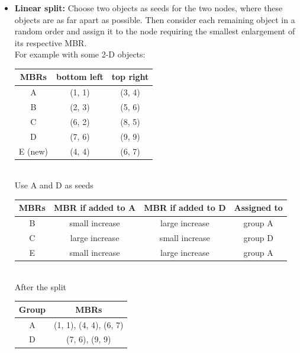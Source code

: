 \documentclass{article}
\begin{document}
\begin{itemize}
    \item \textbf{Linear split:} Choose two objects as seeds for the two nodes, where these objects are as far apart as possible. Then consider each remaining object in a random order and assign it to the node requiring the smallest enlargement of its respective MBR.\\
    For example with some 2-D objects:
    \begin{table}[h]
        \centering
        \begin{tabular}{|c|c|c|}
            \hline
            MBRs & bottom left & top right \\
            \hline
            A & (1, 1) & (3, 4) \\
            B & (2, 3) & (5, 6) \\
            C & (6, 2) & (8, 5) \\
            D & (7, 6) & (9, 9) \\
            E (new) & (4, 4) & (6, 7) \\
            \hline
        \end{tabular}
    \end{table}
    \\
    Use A and D as seeds
    \begin{table} [h]
        \centering
        \begin{tabular}{|c|c|c|c|}
            \hline
            MBRs & MBR if added to A & MBR if added to D & Assigned to \\
            \hline
            B & small increase & large increase & group A\\ 
            C & large increase & small increase & group D\\
            E & small increase & large increase & group A\\
            \hline
        \end{tabular}
    \end{table}
    \\
    \clearpage
    After the split
    \begin{table} [h]
        \centering
        \begin{tabular}{|c|c|}
            \hline
            Group & MBRs \\
            \hline
            A & (1, 1), (4, 4), (6, 7) \\
            \hline
            D & (7, 6), (9, 9) \\
            \hline
        \end{tabular}

\end{table}
\end{itemize}
\end{document}
